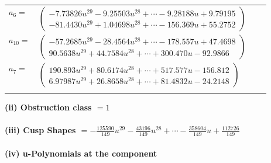 \documentclass[1p]{elsarticle_modified}
\theoremstyle{definition}
\begin{document}
\begin{tabular}{m{7pt} m{180pt} m{7pt} m{180pt} }
\flushright $a_{6}=$&$\begin{pmatrix}-7.73826 u^{29}-9.25503 u^{28}+\cdots-9.28188 u+9.79195\\-81.4430 u^{29}+1.04698 u^{28}+\cdots-156.369 u+55.2752\end{pmatrix}$ \\
\flushright $a_{10}=$&$\begin{pmatrix}-57.2685 u^{29}-28.4564 u^{28}+\cdots-178.557 u+47.4698\\90.5638 u^{29}+44.7584 u^{28}+\cdots+300.470 u-92.9866\end{pmatrix}$ \\
\flushright $a_{7}=$&$\begin{pmatrix}190.893 u^{29}+80.6174 u^{28}+\cdots+517.577 u-156.812\\6.97987 u^{29}+26.8658 u^{28}+\cdots+81.4832 u-24.2148\end{pmatrix}$\\&\end{tabular}
\flushleft \textbf{(ii) Obstruction class $= 1$}\\~\\
\flushleft \textbf{(iii) Cusp Shapes $= -\frac{125590}{149} u^{29}-\frac{43196}{149} u^{28}+\cdots-\frac{358604}{149} u+\frac{112726}{149}$}\\~\\
\newpage\renewcommand{\arraystretch}{1}
\flushleft \textbf{(iv) u-Polynomials at the component}\newline \\
\end{document}
